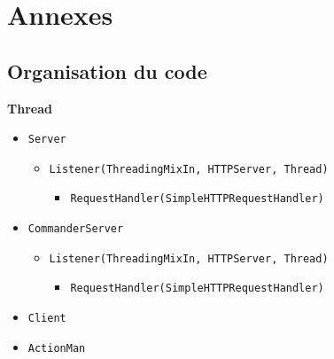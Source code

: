 \documentclass[a4paper,11pt]{article}
\newcommand{\cd}[1]{\texttt{#1}}
\begin{document}
\newpage
\section{Annexes}

\subsection{Organisation du code}

\textbf{Thread}
\begin{itemize}
\item \cd{Server}
	\begin{itemize}
	\item \cd{Listener(ThreadingMixIn, HTTPServer, Thread)}
		\begin{itemize}
		\item \cd{RequestHandler(SimpleHTTPRequestHandler)}
		\end{itemize}
	\end{itemize}

\item \cd{CommanderServer}
	\begin{itemize}
	\item \cd{Listener(ThreadingMixIn, HTTPServer, Thread)}
		\begin{itemize}
		\item \cd{RequestHandler(SimpleHTTPRequestHandler)}
		\end{itemize}
	\end{itemize}

\item \cd{Client}
\item \cd{ActionMan}
\end{itemize}
\end{document}
